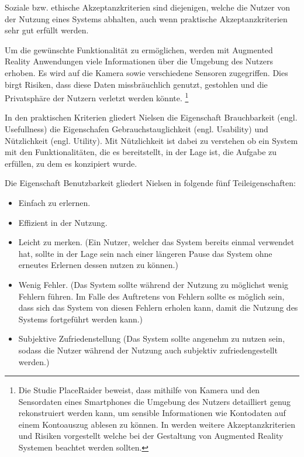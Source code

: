 Soziale bzw. ethische Akzeptanzkriterien sind diejenigen, welche die Nutzer von der Nutzung eines Systems abhalten, auch wenn praktische Akzeptanzkriterien sehr gut erfüllt werden. 

Um die gewünschte Funktionalität zu ermöglichen, werden mit Augmented Reality Anwendungen viele Informationen über die Umgebung des Nutzers erhoben. Es wird auf die Kamera sowie verschiedene Sensoren zugegriffen. Dies birgt Risiken, dass diese Daten missbräuchlich genutzt, gestohlen und die Privatsphäre der Nutzern verletzt werden könnte. \cite[S.~3]{Roesner2013}  \footnote{Die Studie PlaceRaider \cite[S.~9]{Templeman2012} beweist, dass mithilfe von Kamera und den Sensordaten eines Smartphones die Umgebung des Nutzers detailliert genug rekonstruiert werden kann, um sensible Informationen wie Kontodaten auf einem Kontoauszug ablesen zu können. In \cite{Roesner2013,Lebeck2018} werden weitere Akzeptanzkriterien und Risiken vorgestellt welche bei der Gestaltung von Augmented Reality Systemen beachtet werden sollten.}

In den praktischen Kriterien gliedert Nielsen die Eigenschaft Brauchbarkeit (engl. Usefullness) die Eigenschafen Gebrauchstauglichkeit (engl. Usability) und Nützlichkeit (engl. Utility). 
Mit Nützlichkeit ist dabei zu verstehen ob ein System mit den Funktionalitäten, die es bereitstellt, in der Lage ist, die Aufgabe zu erfüllen, zu dem es konzipiert wurde.

Die Eigenschaft Benutzbarkeit gliedert Nielsen in folgende fünf Teileigenschaften: 

\begin{itemize}
	\item Einfach zu erlernen.
	\item Effizient in der Nutzung.
	\item Leicht zu merken. (Ein Nutzer, welcher das System bereits einmal verwendet hat, sollte in der Lage sein nach einer längeren Pause das System ohne erneutes Erlernen dessen nutzen zu können.)
	\item Wenig Fehler. (Das System sollte während der Nutzung zu möglichst wenig Fehlern führen. Im Falle des Auftretens von Fehlern sollte es möglich sein, dass sich das System von diesen Fehlern erholen kann, damit die Nutzung des Systems fortgeführt werden kann.)
	\item Subjektive Zufriedenstellung (Das System sollte angenehm zu nutzen sein, sodass die Nutzer während der Nutzung auch subjektiv zufriedengestellt werden.)
\end{itemize}


